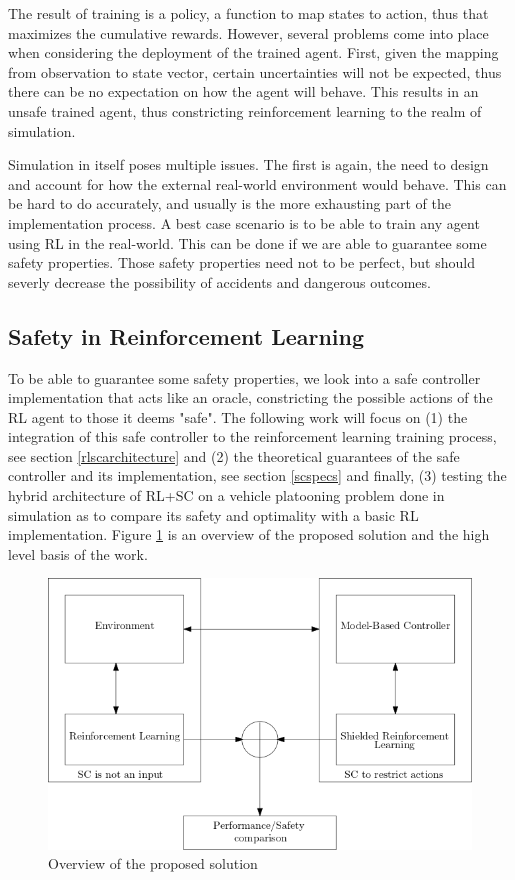 \documentclass[a4paper,11pt]{article}
\begin{document}
\medskip

The result of training is a policy, a function to map states to action, thus that maximizes the cumulative rewards. 
However, several problems come into place when considering the deployment of the trained agent. First, given the mapping from observation to state vector, 
certain uncertainties will not be expected, thus there can be no expectation on how the agent will behave. 
This results in an unsafe trained agent, thus constricting reinforcement learning to the realm of simulation. 

\medskip 

Simulation in itself poses multiple issues. The first is again, the need to design and account for how the external real-world environment would behave. 
This can be hard to do accurately, and usually is the more exhausting part of the implementation process. A best case scenario is to be able to train any agent using RL in the 
real-world. This can be done if we are able to guarantee some safety properties. Those safety properties need not to be perfect, but should severly decrease the possibility of accidents 
and dangerous outcomes. 

\subsection{Safety in Reinforcement Learning}

To be able to guarantee some safety properties, we look into a safe controller implementation that acts like an oracle, constricting the possible actions 
of the RL agent to those it deems "safe". The following work will focus on (1) the integration of this safe controller to 
the reinforcement learning training process, see section \ref{rlscarchitecture} and (2) the theoretical guarantees of the safe controller and its implementation, see section \ref{scspecs} and finally, (3) testing the hybrid architecture of RL+SC 
on a vehicle platooning problem done in simulation as to compare its safety and optimality with a basic RL implementation.
Figure \ref{fig:overviewsol} is an overview of the proposed solution and the high level basis of the work. 

\begin{figure}[H]
  \centering
  \includegraphics[scale=0.6]{overview.png}
  \caption{Overview of the proposed solution}
  \label{fig:overviewsol}
\end{figure}
\end{document}
